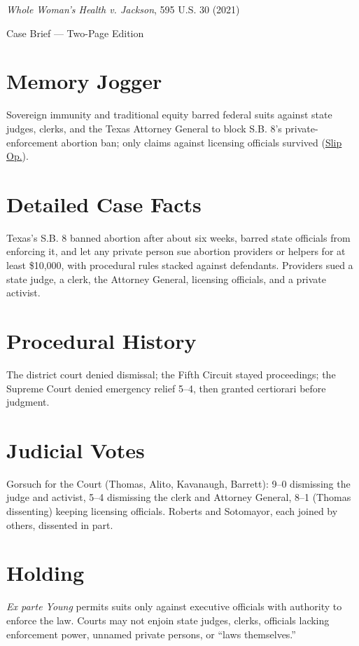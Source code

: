 \documentclass[12pt]{article}
\begin{document}
\begin{center}
{\LARGE \textit{Whole Woman's Health v. Jackson}, 595 U.S. 30 (2021)\par}
\vspace{0.5em}
{\large Case Brief --- Two-Page Edition\par}
\end{center}

\section{Memory Jogger}
Sovereign immunity and traditional equity barred federal suits against state judges, clerks, and the Texas Attorney General to block S.B. 8's private-enforcement abortion ban; only claims against licensing officials survived (\href{https://www.supremecourt.gov/opinions/21pdf/21-463_3ebh.pdf}{Slip Op.}).

\section{Detailed Case Facts}
Texas's S.B. 8 banned abortion after about six weeks, barred state officials from enforcing it, and let any private person sue abortion providers or helpers for at least \$10,000, with procedural rules stacked against defendants. Providers sued a state judge, a clerk, the Attorney General, licensing officials, and a private activist.

\section{Procedural History}
The district court denied dismissal; the Fifth Circuit stayed proceedings; the Supreme Court denied emergency relief 5--4, then granted certiorari before judgment.

\section{Judicial Votes}
Gorsuch for the Court (Thomas, Alito, Kavanaugh, Barrett): 9--0 dismissing the judge and activist, 5--4 dismissing the clerk and Attorney General, 8--1 (Thomas dissenting) keeping licensing officials. Roberts and Sotomayor, each joined by others, dissented in part.

\section{Holding}
\textit{Ex parte Young} permits suits only against executive officials with authority to enforce the law. Courts may not enjoin state judges, clerks, officials lacking enforcement power, unnamed private persons, or ``laws themselves.''
\end{document}
